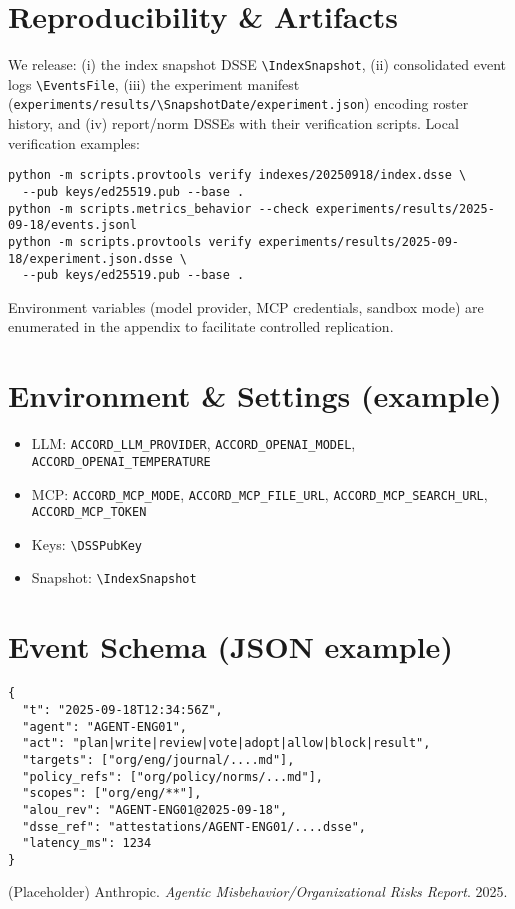 \documentclass[11pt]{article}
\newcommand{\SnapshotDate}{2025-09-18} %
\newcommand{\IndexSnapshot}{indexes/\SnapshotDate/index.dsse}
\newcommand{\EventsFile}{experiments/results/\SnapshotDate/events.jsonl}
\newcommand{\DSSPubKey}{keys/ed25519.pub}
\begin{document}
\section{Reproducibility \& Artifacts}
We release: (i) the index snapshot DSSE \verb|\IndexSnapshot|, (ii) consolidated event logs \verb|\EventsFile|, (iii) the experiment manifest (\verb|experiments/results/\SnapshotDate/experiment.json|) encoding roster history, and (iv) report/norm DSSEs with their verification scripts. Local verification examples:
\begin{verbatim}
python -m scripts.provtools verify indexes/20250918/index.dsse \
  --pub keys/ed25519.pub --base .
python -m scripts.metrics_behavior --check experiments/results/2025-09-18/events.jsonl
python -m scripts.provtools verify experiments/results/2025-09-18/experiment.json.dsse \
  --pub keys/ed25519.pub --base .
\end{verbatim}
Environment variables (model provider, MCP credentials, sandbox mode) are enumerated in the appendix to facilitate controlled replication.

\appendix
\section{Environment \& Settings (example)}
\begin{itemize}[leftmargin=1.2em]
  \item LLM: \verb|ACCORD_LLM_PROVIDER|, \verb|ACCORD_OPENAI_MODEL|, \verb|ACCORD_OPENAI_TEMPERATURE|
  \item MCP: \verb|ACCORD_MCP_MODE|, \verb|ACCORD_MCP_FILE_URL|, \verb|ACCORD_MCP_SEARCH_URL|, \verb|ACCORD_MCP_TOKEN|
  \item Keys: \verb|\DSSPubKey|
  \item Snapshot: \verb|\IndexSnapshot|
\end{itemize}

\section{Event Schema (JSON example)}
\begin{verbatim}
{
  "t": "2025-09-18T12:34:56Z",
  "agent": "AGENT-ENG01",
  "act": "plan|write|review|vote|adopt|allow|block|result",
  "targets": ["org/eng/journal/....md"],
  "policy_refs": ["org/policy/norms/...md"],
  "scopes": ["org/eng/**"],
  "alou_rev": "AGENT-ENG01@2025-09-18",
  "dsse_ref": "attestations/AGENT-ENG01/....dsse",
  "latency_ms": 1234
}
\end{verbatim}

\begin{thebibliography}{9}
\bibitem{anthropic2025}
(Placeholder) Anthropic. \textit{Agentic Misbehavior/Organizational Risks Report}. 2025.
\end{thebibliography}
\end{document}

